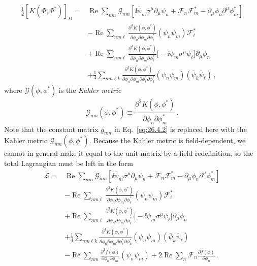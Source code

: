 \begin{equation}
  \begin{aligned}
  \frac12[K(\Phi,\Phi^*)]_D
  ={}&
  \operatorname{Re}\sum_{nm}\mathcal{G}_{nm}
  \left[
    \ii\bar\psi_m\bar\sigma^\mu\partial_\mu\psi_n
    +\mathcal{F}_n\mathcal{F}_m^*
    -\partial_\mu\phi_n\partial^\mu\phi_m^*
  \right]
  \\
  &-\operatorname{Re}\sum_{nm\ell}
    \frac{\partial^3K(\phi,\phi^*)}
         {\partial\phi_n\partial\phi_m\partial\phi_\ell^*}
    (\psi_n\psi_m)\mathcal{F}_\ell^*
  \\
  &+\operatorname{Re}\sum_{nm\ell}
    \frac{\partial^3K(\phi,\phi^*)}
         {\partial\phi_n\partial\phi_m\partial\phi_\ell^*}
    \bigl[-\ii\psi_m\sigma^\mu\bar\psi_\ell\bigr]
    \partial_\mu\phi_n
  \\
  &+\frac14\sum_{nm\ell k}
    \frac{\partial^4K(\phi,\phi^*)}
         {\partial\phi_n\partial\phi_m
          \partial\phi_\ell^*\partial\phi_k^*}
    (\psi_n\psi_m)(\bar\psi_k\bar\psi_\ell)\,,
  \end{aligned}
  \tag{26.8.4}\label{eq:26.8.4}
\end{equation}
where \(\mathcal{G}(\phi,\phi^*)\) is the \textit{Kahler metric}
\begin{equation}
  \mathcal{G}_{nm}(\phi,\phi^*)
  \equiv
  \frac{\partial^2K(\phi,\phi^*)}
       {\partial\phi_n\partial\phi_m^*}\,.
  \tag{26.8.5}\label{eq:26.8.5}
\end{equation}
Note that the constant matrix \(g_{nm}\) in Eq.~\eqref{eq:26.4.2} is replaced
here with the Kahler metric \(\mathcal{G}_{nm}(\phi,\phi^*)\). Because the
Kahler metric is field-dependent, we cannot in general make it equal to the
unit matrix by a field redefinition, so the total Lagrangian must be left in
the form
\begin{equation}
  \begin{aligned}
  \mathcal{L}={}&
  \operatorname{Re}\sum_{nm}\mathcal{G}_{nm}
  \left[
    \ii\bar\psi_m\bar\sigma^\mu\partial_\mu\psi_n
    +\mathcal{F}_n\mathcal{F}_m^*
    -\partial_\mu\phi_n\partial^\mu\phi_m^*
  \right]
  \\
  &-\operatorname{Re}\sum_{nm\ell}
    \frac{\partial^3K(\phi,\phi^*)}
         {\partial\phi_n\partial\phi_m\partial\phi_\ell^*}
    (\psi_n\psi_m)\mathcal{F}_\ell^*
  \\
  &+\operatorname{Re}\sum_{nm\ell}
    \frac{\partial^3K(\phi,\phi^*)}
         {\partial\phi_n\partial\phi_m\partial\phi_\ell^*}
    \bigl[-\ii\psi_m\sigma^\mu\bar\psi_\ell\bigr]
    \partial_\mu\phi_n
  \\
  &+\frac14\sum_{nm\ell k}
    \frac{\partial^4K(\phi,\phi^*)}
         {\partial\phi_n\partial\phi_m
          \partial\phi_\ell^*\partial\phi_k^*}
    (\psi_n\psi_m)(\bar\psi_k\bar\psi_\ell)
  \\
  &-\operatorname{Re}\sum_{nm}
    \frac{\partial^2f(\phi)}{\partial\phi_n\partial\phi_m}
    (\psi_n\psi_m)
  +2\operatorname{Re}\sum_n
    \mathcal{F}_n\frac{\partial f(\phi)}{\partial\phi_n}\,.
  \end{aligned}
  \tag{26.8.6}\label{eq:26.8.6}
\end{equation}
